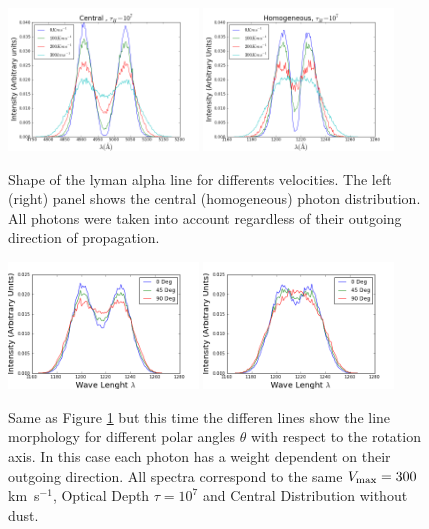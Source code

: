 \documentclass[usenatbib]{mn2e}
\newcommand{\kms}{\,km~s$^{-1}$}
\begin{document}
\begin{figure}
  \includegraphics[width=0.45\textwidth]{7tDifSpeedsZ.png}
  \includegraphics[width=0.45\textwidth]{7tHOMDifSpeeds1.png}
\caption{Shape of the lyman alpha line for
    differents velocities. The left (right) panel shows the central
    (homogeneous) photon distribution. All photons were taken into
    account regardless of their outgoing direction of propagation.
  \label{fig:differentvelocities}}
\end{figure}

\begin{figure}
\includegraphics[width=0.45\textwidth]{Observers7t.png}
\includegraphics[width=0.45\textwidth]{Observers7tHOM.png}
\caption{Same as Figure \ref{fig:differentvelocities} but this time
  the differen lines show the line morphology for different polar angles
  $\theta$ with respect to the rotation axis. In this case each photon
  has a weight dependent on their outgoing direction. All spectra correspond
  to the same $V_{\rm max}=300$\kms, Optical   Depth $\tau=10^{7}$ and
  Central Distribution without dust.}  
  \label{fig:differentobservers}
\end{figure}
\end{document}
